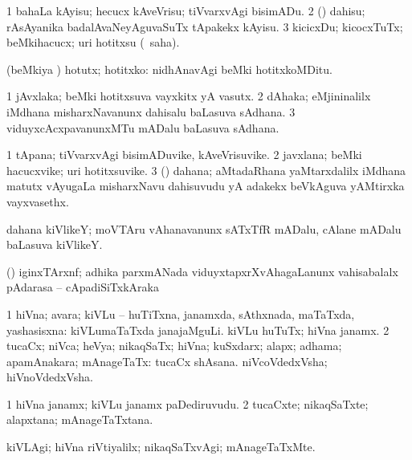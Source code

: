 \bentry
{}
\gl{\sakirx}
\bmng
\bnum
\num{1} bahaLa kAyisu; hecucx kAveVrisu; tiVvarxvAgi bisimADu. 
\num{2} (\ravi) dahisu; rAsAyanika badalAvaNeyAguvaSuTx tApakekx kAyisu. 
\num{3} kicicxDu; kicocxTuTx; beMkihacucx; uri hotitxsu (\rUpa\ saha). 
\enum
\emng

\noindent
\gl{\akirx}
\bmng
(beMkiya \vi) hotutx; hotitxko:  nidhAnavAgi beMki hotitxkoMDitu. 
\emng
\eentry

\bentry
{}
\gl{\nA}
\bmng
\bnum
\num{1} jAvxlaka; beMki hotitxsuva vayxkitx yA vasutx. 
\num{2} dAhaka; eMjininalilx iMdhana misharxNavanunx dahisalu baLasuva sAdhana. 
\num{3} viduyxcAcxpavanunxMTu mADalu baLasuva sAdhana. 
\enum
\emng
\eentry

\bentry
{}
\gl{\nA}
\bmng
\bnum
\num{1} tApana; tiVvarxvAgi bisimADuvike, kAveVrisuvike. 
\num{2} javxlana; beMki hacucxvike; uri hotitxsuvike. 
\num{3} (\ravi) dahana; aMtadaRhana yaMtarxdalilx iMdhana matutx vAyugaLa misharxNavu dahisuvudu yA adakekx beVkAguva yAMtirxka vayxvasethx. 
\enum
\emng
\eentry


\bentry
{}
\gl{\nA}
\bmng
dahana kiVlikeY; moVTAru vAhanavanunx sATxTfR mADalu, cAlane mADalu baLasuva kiVlikeY. 
\emng
\eentry

\bentry
{}
\gl{\nA}
\bmng
(\viduyx) iginxTArxnf; adhika parxmANada viduyxtapxrXvAhagaLanunx vahisabalalx pAdarasa -- cApadiSiTxkAraka  
\emng
\eentry

\bentry
{}
\gl{\gu}
\bmng
\bnum
\num{1} hiVna; avara; kiVLu -- huTiTxna, janamxda, sAthxnada, maTaTxda, yashasisxna:  kiVLumaTaTxda janajaMguLi.  kiVLu huTuTx; hiVna janamx. 
\num{2} tucaCx; niVca; heVya; nikaqSaTx; hiVna; kuSxdarx; alapx; adhama; apamAnakara; mAnageTaTx:  tucaCx shAsana.  niVcoVdedxVsha; hiVnoVdedxVsha. 
\enum
\emng
\eentry

\bentry
{}
\gl{\nA}
\bmng
\bnum
\num{1} hiVna janamx; kiVLu janamx paDediruvudu. 
\num{2} tucaCxte; nikaqSaTxte; alapxtana; mAnageTaTxtana. 
\enum
\emng
\eentry

\bentry
{}
\gl{\kirxvi}
\bmng
kiVLAgi; hiVna riVtiyalilx; nikaqSaTxvAgi; mAnageTaTxMte. 
\emng
\eentry

